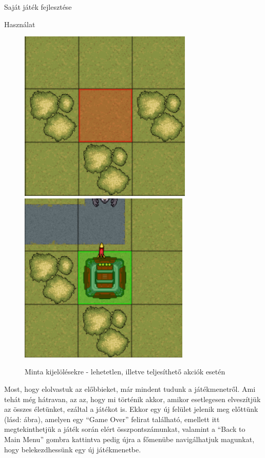 \begin{MyChapter}{Saját játék fejlesztése}
\begin{MySection}{Használat}
		\begin{figure}[H]
			\centering
			\includegraphics[scale=0.858]{kepek/jatekHasznalat/minta_rossz_kijeloles}
			\includegraphics[scale=0.86]{kepek/jatekHasznalat/minta_jo_kijeloles}
			\caption{Minta kijelölésekre - lehetetlen, illetve teljesíthető akciók esetén}
			\label{fig:jatekHasznalat:kijeloles_minta}
		\end{figure}
		
		
		Most, hogy elolvastuk az előbbieket, már mindent tudunk a játékmenetről. Ami tehát még hátravan, az az, hogy mi történik akkor, amikor esetlegesen elveszítjük az összes életünket, ezáltal a játékot is.
		Ekkor egy új felület jelenik meg előttünk (lásd:  ábra), amelyen egy ``Game Over'' felirat található, emellett itt megtekinthetjük a játék során elért összpontszámunkat, valamint a ``Back to Main Menu'' gombra kattintva pedig újra a főmenübe navigálhatjuk magunkat, hogy belekezdhessünk egy új játékmenetbe.
		

\end{MySection}
\end{MyChapter}
